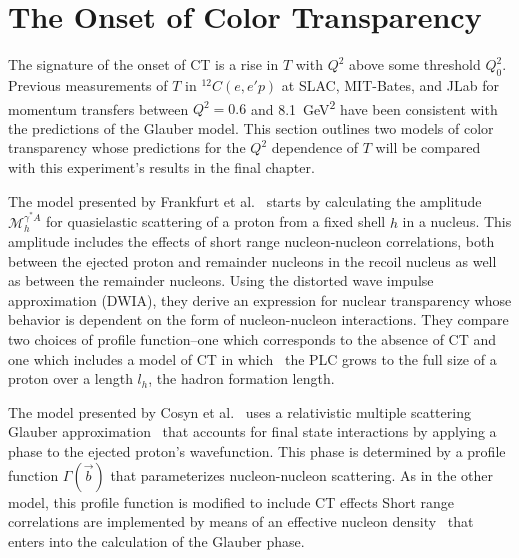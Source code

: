 \section{The Onset of Color Transparency}
The signature of the onset of CT is a rise in $T$ with $Q^2$ above some
threshold $Q^2_0$.
Previous measurements of $T$ in ${}^{12}C(e,e'p)$ at SLAC, MIT-Bates, and JLab
for momentum transfers between $Q^2=0.6$ and
\SI{8.1}{\giga\electronvolt\squared} have been consistent with the predictions
of the Glauber model.
This section outlines two models of color transparency whose predictions for
the $Q^2$ dependence of $T$ will be compared with this experiment's results in
the final chapter.


The model presented by Frankfurt et al.~\cite{Frankfurt_1995_PRC} starts by
calculating the amplitude $\mathcal{M}_{h}^{\gamma^*A}$ for quasielastic
scattering of a proton from a fixed shell $h$ in a nucleus.
This amplitude includes the effects of short range nucleon-nucleon
correlations, both between the ejected proton and remainder nucleons in the
recoil nucleus as well as between the remainder nucleons.
Using the distorted wave impulse approximation (DWIA), they derive an
expression for nuclear transparency whose behavior is dependent on the form of
nucleon-nucleon interactions.
They compare two choices of profile function--one which corresponds to the
absence of CT and one which includes a model of CT in which~\cite{Farrar_1988}
the PLC grows to the full size of a proton over a length $l_h$, the hadron
formation length.


The model presented by Cosyn et al.~\cite{Cosyn_2008,Cosyn_2006} uses a
relativistic multiple scattering Glauber approximation~\cite{Ryckebusch_2003}
that accounts for final state interactions by applying a phase to the ejected
proton's wavefunction.
This phase is determined by a profile function $\Gamma(\vec{b})$ that
parameterizes nucleon-nucleon scattering.
As in the other model, this profile function is modified to include CT effects
Short range correlations are implemented by means of an effective nucleon
density~\cite{Frankel_1994} that enters into the calculation of the Glauber
phase.


